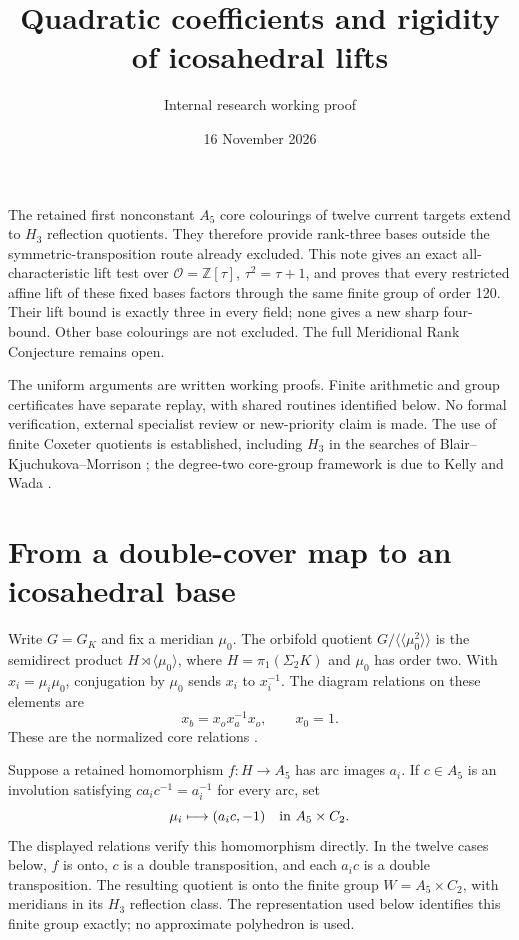 \documentclass[11pt]{article}
\title{Quadratic coefficients and rigidity of icosahedral lifts}
\author{Internal research working proof}
\date{16 November 2026}
\newcommand{\Z}{\mathbb Z}
\newcommand{\OO}{\mathcal O}
\begin{document}
\maketitle

The retained first nonconstant $A_5$ core colourings of twelve current
targets extend to $H_3$ reflection quotients. They therefore provide
rank-three bases outside the symmetric-transposition route already
excluded. This note gives an exact all-characteristic lift test over
$\OO=\Z[\tau]$, $\tau^2=\tau+1$, and proves that every restricted affine
lift of these fixed bases factors through the same finite group of
order 120. Their lift bound is exactly three in every field; none
gives a new sharp four-bound. Other base colourings are not excluded.
The full Meridional Rank Conjecture remains open.

The uniform arguments are written working proofs. Finite arithmetic
and group certificates have separate replay, with shared routines
identified below. No formal verification, external specialist review
or new-priority claim is made. The use of finite Coxeter quotients is
established, including $H_3$ in the searches of
Blair--Kjuchukova--Morrison \cite{bkm}; the degree-two core-group
framework is due to Kelly and Wada \cite{core}.

\section{From a double-cover map to an icosahedral base}

Write $G=G_K$ and fix a meridian $\mu_0$. The orbifold quotient
$G/\langle\!\langle\mu_0^2\rangle\!\rangle$ is the semidirect product
$H\rtimes\langle\mu_0\rangle$, where
$H=\pi_1(\Sigma_2K)$ and $\mu_0$ has order two. With
$x_i=\mu_i\mu_0$, conjugation by $\mu_0$ sends $x_i$ to $x_i^{-1}$.
The diagram relations on these elements are
\[
                  x_b=x_o x_a^{-1}x_o,\qquad x_0=1.
\]
These are the normalized core relations \cite{core}.

Suppose a retained homomorphism $f:H\to A_5$ has arc images $a_i$.
If $c\in A_5$ is an involution satisfying
$c a_i c^{-1}=a_i^{-1}$ for every arc, set
\[
         \mu_i\longmapsto (a_i c,-1)\quad\hbox{in }A_5\times C_2.
\]
The displayed relations verify this homomorphism directly. In the
twelve cases below, $f$ is onto, $c$ is a double transposition, and
each $a_i c$ is a double transposition. The resulting quotient is onto
the finite group $W=A_5\times C_2$, with meridians in its $H_3$
reflection class. The representation used below identifies this
finite group exactly; no approximate polyhedron is used.
\end{document}
